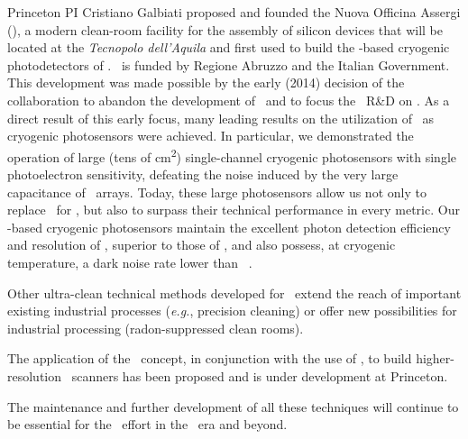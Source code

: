 \begin{compactitem}
\item Princeton PI Cristiano Galbiati proposed and founded the Nuova Officina Assergi (\NOA), a modern clean-room facility for the assembly of silicon devices that will be located at the {\it Tecnopolo dell'Aquila} and first used to build the \SiPM-based cryogenic photodetectors of \DSks.  \NOA\ is funded by Regione Abruzzo and the Italian Government.  This development was made possible by the early (2014) decision of the collaboration to abandon the development of \PMTs\ and to focus the \DSs\ R\&D on \SiPMs.  As a direct result of this early focus, many leading results on the utilization of \SiPMs\ as cryogenic photosensors were achieved.  In particular, we demonstrated the operation of large (tens of \si{\square\cm}) single-channel cryogenic photosensors with single photoelectron sensitivity, defeating the noise induced by the very large capacitance of \SiPMs\ arrays.  Today, these large photosensors allow us not only to replace \PMTs\ for \DSks, but also to surpass their technical performance in every metric.  Our \SiPM-based cryogenic photosensors maintain the excellent photon detection efficiency and resolution of \SiPMs, superior to those of \PMTs, and also possess, at cryogenic temperature, a dark noise rate lower than \PMTs~\cite{DIncecco:2018hy}.

\item Other ultra-clean technical methods developed for \DSfs\ extend the reach of important existing industrial processes ({\it e.g.}, precision cleaning) or offer new possibilities for industrial processing (radon-suppressed clean rooms).

\item The application of the \LArTPC\ concept, in conjunction with the use of \SiPMs, to build higher-resolution \PET\ scanners has been proposed and is under development at Princeton.

\end{compactitem}

The maintenance and further development of all these techniques will continue to be essential for the \GADMC\ effort in the \DSks\ era and beyond.